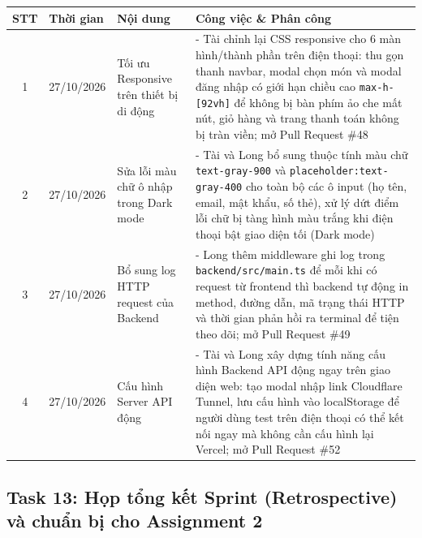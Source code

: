 \documentclass[12pt, a4paper]{article}
\begin{document}
\begin{tabularx}{\textwidth}{|c|p{3.2cm}|Y|Y|}
    \hline
    \textbf{STT} & \textbf{Thời gian} & \textbf{Nội dung} & \textbf{Công việc \& Phân công} \\
    \hline

    1 & 27/10/2026 & Tối ưu Responsive trên thiết bị di động &
    - Tài chỉnh lại CSS responsive cho 6 màn hình/thành phần trên điện thoại: thu gọn thanh navbar, modal chọn món và modal đăng nhập có giới hạn chiều cao \texttt{max-h-[92vh]} để không bị bàn phím ảo che mất nút, giỏ hàng và trang thanh toán không bị tràn viền; mở Pull Request \#48 \\
    \hline

    2 & 27/10/2026 & Sửa lỗi màu chữ ô nhập trong Dark mode &
    - Tài và Long bổ sung thuộc tính màu chữ \texttt{text-gray-900} và \texttt{placeholder:text-gray-400} cho toàn bộ các ô input (họ tên, email, mật khẩu, số thẻ), xử lý dứt điểm lỗi chữ bị tàng hình màu trắng khi điện thoại bật giao diện tối (Dark mode) \\
    \hline

    3 & 27/10/2026 & Bổ sung log HTTP request của Backend &
    - Long thêm middleware ghi log trong \texttt{backend/src/main.ts} để mỗi khi có request từ frontend thì backend tự động in method, đường dẫn, mã trạng thái HTTP và thời gian phản hồi ra terminal để tiện theo dõi; mở Pull Request \#49 \\
    \hline

    4 & 27/10/2026 & Cấu hình Server API động &
    - Tài và Long xây dựng tính năng cấu hình Backend API động ngay trên giao diện web: tạo modal nhập link Cloudflare Tunnel, lưu cấu hình vào localStorage để người dùng test trên điện thoại có thể kết nối ngay mà không cần cấu hình lại Vercel; mở Pull Request \#52 \\
    \hline
\end{tabularx}

\vspace{0.8cm}

\subsection*{Task 13: Họp tổng kết Sprint (Retrospective) và chuẩn bị cho Assignment 2}
\end{document}
